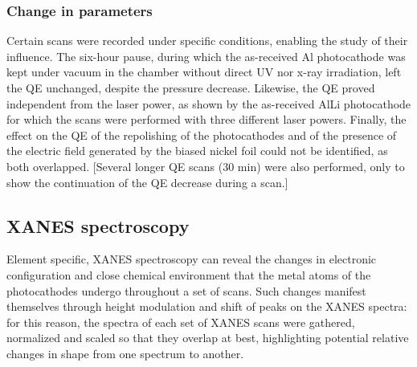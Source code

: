 \documentclass[aip,graphicx]{revtex4-1}
\begin{document}
\subsubsection*{Change in parameters}
Certain scans were recorded under specific conditions, enabling the study of their influence. The six-hour pause, during which the as-received Al photocathode was kept under vacuum in the chamber without direct UV nor x-ray irradiation, left the QE unchanged, despite the pressure decrease. Likewise, the QE proved independent from the laser power, as shown by the as-received AlLi photocathode for which the scans were performed with three different laser powers. Finally, the effect on the QE of the repolishing of the photocathodes and of the presence of the electric field generated by the biased nickel foil could not be identified, as both overlapped. 
[Several longer QE scans (30 min) were also performed, only to show the continuation of the QE decrease during a scan.]

\subsection{XANES spectroscopy}

Element specific, XANES spectroscopy can reveal the changes in electronic configuration and close chemical environment that the metal atoms of the photocathodes undergo throughout a set of scans. Such changes manifest themselves through height modulation and shift of peaks on the XANES spectra: for this reason, the spectra of each set of XANES scans were gathered, normalized and scaled so that they overlap at best, highlighting potential relative changes in shape from one spectrum to another. 
\end{document}
